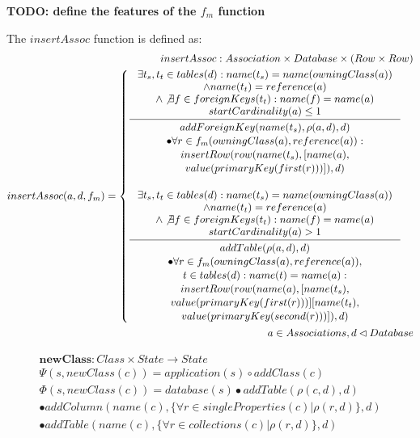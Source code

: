 \documentclass[11pt]{article}
\begin{document}
\textbf{TODO: define the features of the $f_m$ function}

The $insertAssoc$ function is defined as:
\begin{align*}
insertAssoc : Association \times Database \times (Row \times Row) \\
insertAssoc(a, d, f_m) = \begin{cases}
\inference{ \exists t_s, t_t \in tables(d) : name(t_s) = name(owningClass(a)) \\ \wedge name(t_t) = reference(a) \\ \wedge \not \exists f \in foreignKeys(t_t) : name(f) = name(a) \\ startCardinality(a) \leq 1}{\begin{gathered}
addForeignKey(name(t_s), \rho(a,d), d) \\ \bullet \forall r \in f_m(owningClass(a), reference(a)) : \\ insertRow(row(name(t_s), [name(a), \\ value(primaryKey(first(r)))]), d)
\end{gathered}
 }
 \\ \\
\inference{ \exists t_s, t_t \in tables(d) : name(t_s) = name(owningClass(a)) \\ \wedge name(t_t) = reference(a) \\ \wedge \not \exists f \in foreignKeys(t_t) : name(f) = name(a) \\ startCardinality(a) > 1}{\begin{gathered} addTable(\rho(a,d),d) \\ \bullet \forall r \in f_m(owningClass(a), reference(a)),\\ t \in tables(d) : name(t) = name(a) : \\ insertRow(row(name(a), [name(t_s), \\ value(primaryKey(first(r)))] [name(t_t), \\ value(primaryKey(second(r)))]), d)
\end{gathered}
 } 
 \end{cases}\\
 a \in Associations, d \lhd Database
\end{align*}

\begin{align*}
\mathbf{newClass} : Class \times State \rightarrow State \\
\Psi(s, newClass(c)) = application(s) \circ addClass(c) \\
\Phi(s, newClass(c)) = database(s)  \bullet addTable(\rho(c,d), d) \\ \bullet addColumn(name(c), \{\forall r \in singleProperties(c) | \rho(r,d)\}, d) \\ \bullet addTable(name(c), \{\forall r \in collections(c) | \rho(r,d)\}, d)  
\end{align*}
\end{document}
